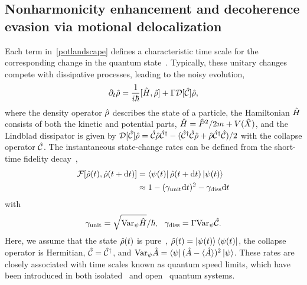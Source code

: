 \documentclass[reprint,prx,footinbib,floatfix,twocolumn,longbibliography,superscriptaddress]{revtex4-2}
\begin{document}
\subsection{Nonharmonicity enhancement and decoherence evasion via motional delocalization}
Each term in~\eqref{potlandscape} defines a characteristic time scale for the corresponding change in the quantum state~\cite{Riera-Campeny2024}.
Typically, these unitary changes compete with dissipative processes, leading to the noisy evolution,
\begin{align}
    \partial_{t} \hat{\rho}= \frac{1}{i \hbar} [\hat{H},\hat{\rho}] + \Gamma\mathcal{D}[\hat{\mathcal{C}}]\hat{\rho},
    \label{mastereq0}
\end{align}
where the density operator $\hat{\rho}$ describes the state of a particle, the Hamiltonian $\hat{H}$ consists of both the kinetic and potential parts, $\hat{H} = \hat{P}^2 / 2 m +  V (\hat{X}) $, and the Lindblad dissipator is given by $\mathcal{D}[\hat{\mathcal{C}}]\hat{\rho} = \hat{\mathcal{C}} \hat{\rho} \hat{\mathcal{C}}^\dagger - (\hat{\mathcal{C}}^\dagger \hat{\mathcal{C}}  \hat{\rho} + \hat{\rho}  \hat{\mathcal{C}}^\dagger \hat{\mathcal{C}} )/2$ with the collapse operator $ \hat{\mathcal{C}}$.
The instantaneous state-change rates can be defined from the short-time fidelity decay~\cite{Bures1969,Jozsa1994}, 
\begin{align}
    \mathcal{F}[\hat{\rho}(t),\hat{\rho}(t + \dd t) ] &= \bra{\psi (t)}\hat{\rho}(t + \dd t)  \ket{\psi (t)}  \nonumber \\ 
    & \approx 1 - (\gamma_\text{unit} \dd t )^2 - \gamma_\text{diss} \dd t
\end{align}
with 
\begin{align}
   \Rate_\text{unit} =  \sqrt{\Var_{\WaveFunction} \Hamiltonian}/\hbar, \ \ 
   \Rate_\text{diss} = \CollapseFockCoeff \Var_{\WaveFunction} \CollapseFock.
\end{align}
Here, we assume that the state $\hat{\rho}(t)$ is pure~\cite{Jozsa1994},  $\hat{\rho}(t) = \ket{\psi (t)} \bra{\psi (t)}$, the collapse operator is Hermitian, $\hat{\mathcal{C}} = \hat{\mathcal{C}}^\dagger$, and $\text{Var}_{\psi} \hat{A} = \bra{\psi} (\hat{A}  - \langle \hat{A}  \rangle)^2 \ket{ \psi}$.
These rates are closely associated with time scales known as quantum speed limits, which have been introduced in both isolated~\cite{Mandelstam1945,Uffink1993,Margolus1998,Levitin2009} and open~\cite{Taddei2013,delCampo2013,Deffner2013a} quantum systems.
\end{document}
